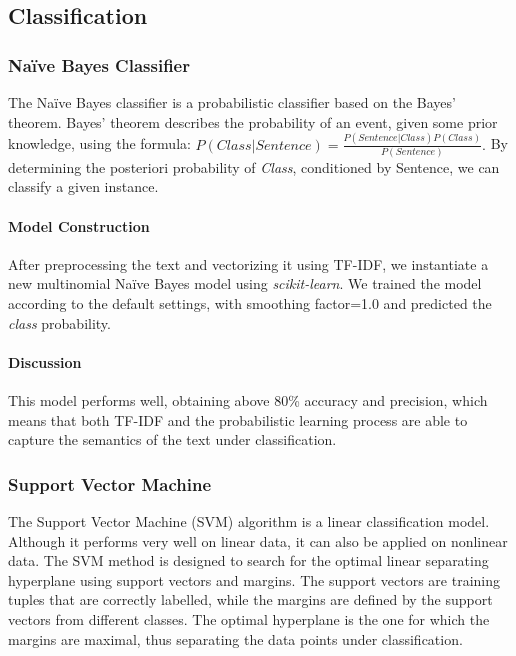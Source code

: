 
\subsection{Classification}\label{classification}
\subsubsection{Naïve Bayes Classifier}
The Naïve Bayes classifier is a probabilistic classifier based on the Bayes' theorem.
Bayes' theorem describes the probability of an event, given some prior knowledge, using the formula:
$P(Class|Sentence)=\frac{P(Sentence|Class)P(Class)}{P(Sentence)}.$
By determining the posteriori probability of \textit{Class}, conditioned by Sentence, we can classify a given instance.

\paragraph{Model Construction}
After preprocessing the text and vectorizing it using TF-IDF, we instantiate a new multinomial Naïve Bayes model using \textit{scikit-learn}\cite{scikit-learn}. We trained the model according to the default settings, with smoothing factor=1.0 and predicted the \textit{class} probability.

\paragraph{Discussion}
This model performs well, obtaining above 80\% accuracy and precision, which means that both TF-IDF and the probabilistic learning process are able to capture the semantics of the text under classification.

\subsubsection{Support Vector Machine}
The Support Vector Machine (SVM) algorithm is a linear classification model. Although it performs very well on linear data, it can also be applied on nonlinear data. The SVM method is designed to search for the optimal linear separating hyperplane using support vectors and margins. The support vectors are training tuples that are correctly labelled, while the margins are defined by the support vectors from different classes. The optimal hyperplane is the one for which the margins are maximal, thus separating the data points under classification.


